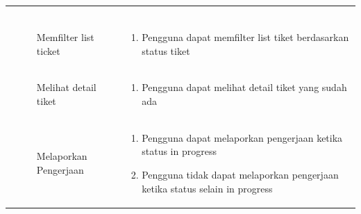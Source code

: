 \documentclass[12pt]{article}
\begin{document}
\begin{enumerate}[label=\textbf{5.\arabic*.}]
\begin{enumerate}[label=\textbf{5.2.\arabic*.}]
\begin{longtable}{ |l|l|p{}| }
\begin{enumerate}[label=\arabic*.]
                                                            \end{enumerate}\\\cline{2-3}
                                & Memfilter list ticket & \begin{enumerate}[label=\arabic*.]
                                                                \item Pengguna dapat memfilter list tiket berdasarkan status tiket  
                                                            \end{enumerate}\\\cline{2-3}
                                & Melihat detail tiket  & \begin{enumerate}[label=\arabic*.]
                                                                \item Pengguna dapat melihat detail tiket yang sudah ada 
                                                            \end{enumerate}\\\cline{2-3}
                                & Melaporkan Pengerjaan & \begin{enumerate}[label=\arabic*.]
                                                                \item Pengguna dapat melaporkan pengerjaan ketika status in progress
                                                                \item Pengguna tidak dapat melaporkan pengerjaan ketika status selain in progress
                                                            \end{enumerate}\\\cline{2-3}
            \hline


\end{longtable}
\end{enumerate}
\end{enumerate}
\end{document}
